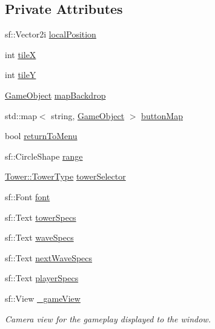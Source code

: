 \subsection*{Private Attributes}
\begin{DoxyCompactItemize}
\item 
sf\+::\+Vector2i \hyperlink{class_game_state_play_aef4648e9978d2b031365686fa5221038}{local\+Position}
\item 
int \hyperlink{class_game_state_play_a6c82bd77433f30b20a88e19ab37a7f96}{tile\+X}
\item 
int \hyperlink{class_game_state_play_ae34c6aa315832bd457df59720345534e}{tile\+Y}
\item 
\hyperlink{class_game_object}{Game\+Object} \hyperlink{class_game_state_play_a1114fc8f3e15f5f46ab4361dad37ad0b}{map\+Backdrop}
\item 
std\+::map$<$ string, \hyperlink{class_game_object}{Game\+Object} $>$ \hyperlink{class_game_state_play_ab0755d9a7eb5708a840d82bbdc7eb9f2}{button\+Map}
\item 
bool \hyperlink{class_game_state_play_a6f5a18b6d0597c0f6c4d26b4df873ee6}{return\+To\+Menu}
\item 
sf\+::\+Circle\+Shape \hyperlink{class_game_state_play_a4ac9c1b314dfbfe0082728eacfc401fc}{range}
\item 
\hyperlink{class_tower_a110a21c18d4ec095c6234bd17f004b3e}{Tower\+::\+Tower\+Type} \hyperlink{class_game_state_play_ac22880bd1c34ebbe5d45182caaaf2523}{tower\+Selector}
\item 
sf\+::\+Font \hyperlink{class_game_state_play_a333494e6c4a8ae4a285635776c3b486e}{font}
\item 
sf\+::\+Text \hyperlink{class_game_state_play_add98cf58c2cc6af809cade72be6c6c0a}{tower\+Specs}
\item 
sf\+::\+Text \hyperlink{class_game_state_play_a61669dc94331d0302f3a0f5792304049}{wave\+Specs}
\item 
sf\+::\+Text \hyperlink{class_game_state_play_afee193abc64a41d61a08db7d6d5b507d}{next\+Wave\+Specs}
\item 
sf\+::\+Text \hyperlink{class_game_state_play_a5e7f3929ab226b4ad0fb627d3c779f84}{player\+Specs}
\item 
sf\+::\+View \hyperlink{class_game_state_play_a9513cfeac2178d83e23ba6f9291fba8c}{\+\_\+game\+View}
\begin{DoxyCompactList}\small\item\em Camera view for the gameplay displayed to the window. \end{DoxyCompactList}\item 

\end{DoxyCompactItemize}
